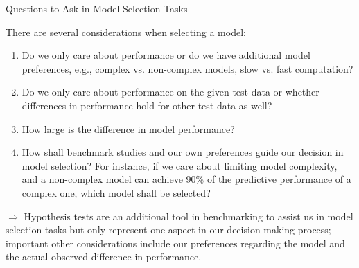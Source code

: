 \documentclass[11pt,compress,t,notes=noshow, xcolor=table]{beamer}
\begin{document}
\begin{frame}{Questions to Ask in Model Selection Tasks}

There are several considerations when selecting a model:
\vspace{0.25cm}
\begin{enumerate}
    \setlength\itemsep{1em}
    \item Do we only care about performance or do we have additional model preferences, e.g., complex vs. non-complex models, slow vs. fast computation?
    \item Do we only care about performance on the given test data or whether differences in performance hold for other test data as well?
    \item How large is the difference in model performance?
    \item How shall benchmark studies and our own preferences guide our decision in model selection? For instance, if we care about limiting model complexity, and a non-complex model can achieve 90\% of the predictive performance of a complex one, which model shall be selected?
\end{enumerate}
\vspace{0.5cm}
$\Rightarrow$ Hypothesis tests are an additional tool in benchmarking to assist us in model selection tasks but only represent one aspect in our decision making process; important other considerations include our preferences regarding the model and the actual observed difference in performance.



\end{frame}
\end{document}
